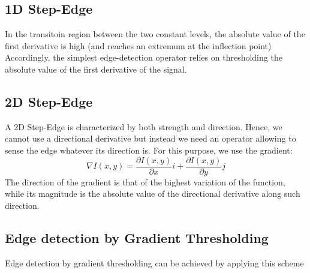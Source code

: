 \documentclass{article}
\begin{document}
\subsection{1D Step-Edge} %
In the transitoin region between the two constant levels, the absolute value of the first derivative is high (and reaches an extremum at the inflection point)
Accordingly, the simplest edge-detection operator relies on thresholding the absolute value of the first derivative of the signal. 
\subsection{2D Step-Edge}
A 2D Step-Edge is characterized by both strength and direction. Hence, we cannot use a directional derivative but instead we need an operator allowing to sense the edge whatever its direction is. For this purpose, we use the gradient:
\[
    \nabla I(x,y)=\displaystyle\frac{\partial I (x,y)}{\partial x}i + \displaystyle\frac{\partial I (x,y)}{\partial y} j
\]
The direction of the gradient is that of the highest variation of the function, while its magnitude is the absolute value of the directional derivative along such direction. 

\subsection{Edge detection by Gradient Thresholding}
Edge detection by gradient thresholding can be achieved by applying this scheme 
\end{document}
